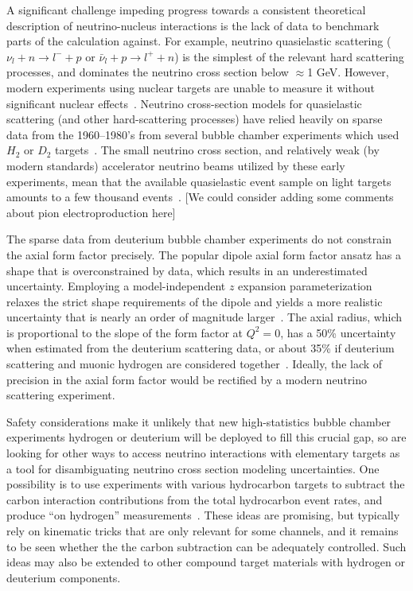 A significant challenge impeding progress towards a consistent theoretical description of neutrino-nucleus interactions is the lack of data to benchmark parts of the calculation against. For example, neutrino quasielastic scattering ($\nu_{l} + n \rightarrow l^{-} + p$ or $\bar{\nu}_{l} + p \rightarrow l^{+} + n$) is the simplest of the relevant hard scattering processes, and dominates the neutrino cross section below  $\approx$1 GeV. However, modern experiments using nuclear targets are unable to measure it without significant nuclear effects~\cite{garvey_review_2014, NuSTEC:2017hzk}.
Neutrino cross-section models for quasielastic scattering (and other hard-scattering processes) have relied heavily on sparse data from the 1960--1980's from several bubble chamber experiments which used $H_{2}$ or $D_2$ targets~\cite{zeller12, ParticleDataGroup:2020ssz}.
The small neutrino cross section, and relatively weak (by modern standards) accelerator neutrino beams utilized by these early experiments, mean that the available quasielastic event sample on light targets amounts to a few thousand events~\cite{ANL_Barish_1977, BNL_Baker_1981}.
{\color{red} [We could consider adding some comments about pion electroproduction here]}

The sparse data from deuterium bubble chamber experiments do not constrain
 the axial form factor precisely.
The popular dipole axial form factor ansatz has a shape that
 is overconstrained by data, which results in an underestimated uncertainty.
Employing a model-independent $z$ expansion parameterization
 relaxes the strict shape requirements of the dipole and yields
 a more realistic uncertainty that is nearly an order of magnitude larger~\cite{Meyer:2016oeg}.
The axial radius, which is proportional to the slope of the form factor at $Q^2=0$,
 has a 50\% uncertainty when estimated from the deuterium scattering data,
 or about 35\% if deuterium scattering and muonic hydrogen are considered
 together~\cite{Hill:2017wgb}.
Ideally, the lack of precision in the axial form factor would
 be rectified by a modern neutrino scattering experiment.

Safety considerations make it unlikely that new high-statistics bubble chamber experiments 
hydrogen or deuterium will be deployed to fill this crucial gap,
so  are looking for other ways to access neutrino interactions
with elementary targets as a tool for disambiguating neutrino cross section modeling uncertainties.
One possibility is to use experiments with various hydrocarbon targets to subtract the carbon interaction contributions from
 the total hydrocarbon event rates, and produce ``on hydrogen'' measurements~\cite{PhysRevD.92.051302, PhysRevD.101.092003, Hamacher-Baumann:2020ogq, DUNE:2021tad}.
These ideas are promising, but typically rely on kinematic tricks that are only relevant for some channels, and it remains to be seen whether the  the carbon subtraction can be adequately controlled. Such ideas may also be extended to other compound target materials with hydrogen or deuterium components.

